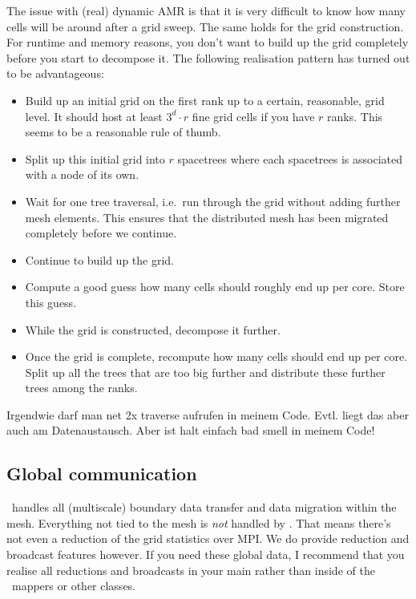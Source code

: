 The issue with (real) dynamic AMR is that it is very difficult to know how many
cells will be around after a grid sweep.
The same holds for the grid construction.
For runtime and memory reasons, you don't want to build up the grid completely
before you start to decompose it.
The following realisation pattern has turned out to be advantageous:
\begin{itemize}
  \item Build up an initial grid on the first rank up to a certain, reasonable,
  grid level. It should host at least $3^d \cdot r$ fine grid cells if you have
  $r$ ranks. This seems to be a reasonable rule of thumb.
  \item Split up this initial grid into $r$ spacetrees where each spacetrees is
  associated with a node of its own.
  \item Wait for one tree traversal, i.e.~run through the grid without adding
  further mesh elements. This ensures that the distributed mesh has been
  migrated completely before we continue.
  \item Continue to build up the grid.
  \item Compute a good guess how many cells should roughly end up per core.
  Store this guess.
  \item While the grid is constructed, decompose it further.
  \item Once the grid is complete, recompute how many cells should end up per
  core. Split up all the trees that are too big further and distribute these
  further trees among the ranks.
\end{itemize}



\begin{remark}
Irgendwie darf man net 2x traverse aufrufen in meinem Code. Evtl. liegt das aber
auch am Datenaustausch. Aber ist halt einfach bad smell in meinem Code!
\end{remark}

 

\subsection{Global communication}

\Peano\ handles all (multiscale) boundary data transfer and data migration
within the mesh.
Everything not tied to the mesh is \emph{not} handled by \Peano.
That means there's not even a reduction of the grid statistics over MPI.
We do provide reduction and broadcast features however. 
If you need these global data, I recommend that you realise all reductions and
broadcasts in your main rather than inside of the \Peano\ mappers or other
classes.



 